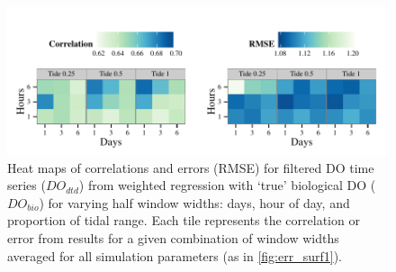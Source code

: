 \documentclass[letterpaper,12pt,oneside]{article}\usepackage[]{graphicx}\usepackage[]{color}
\makeatletter
\def\maxwidth{ %
  \ifdim\Gin@nat@width>\linewidth
    \linewidth
  \else
    \Gin@nat@width
  \fi
}
\newenvironment{knitrout}{}{} %
\makeatother
\begin{document}
\centering\vspace*{\fill}
\begin{knitrout}
\color{fgcolor}\begin{figure}[!ht]


{\centering \includegraphics[width=\maxwidth]{figure/err_surf2} 

}

\caption[Heat maps of correlations and errors (\ac{RMSE}) for filtered \ac{DO} time series ($DO_{dtd}$) from weighted regression with `true' biological \ac{DO} ($DO_{bio}$) for varying half window widths]{Heat maps of correlations and errors (\ac{RMSE}) for filtered \ac{DO} time series ($DO_{dtd}$) from weighted regression with `true' biological \ac{DO} ($DO_{bio}$) for varying half window widths: days, hour of day, and proportion of tidal range.  Each tile represents the correlation or error from results for a given combination of window widths averaged for all simulation parameters (as in \cref{fig:err_surf1}).\label{fig:err_surf2}}
\end{figure}


\end{knitrout}
\vfill
\clearpage
\end{document}
